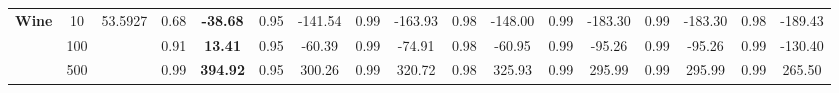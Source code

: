 \documentclass[letterpaper]{article}
\theoremstyle{definition}
\begin{document}
\begin{table}[h]
\begin{tabular}{|c|c|c|c|c|c|c|c|c|c|c|c|c|c|c|c|c|}
\multirow{3}{*}{\textbf{Wine}}      & 10       & 53.5927  & 0.68  & \textbf{-38.68}  & 0.95  & -141.54          & 0.99   & -163.93           & 0.98      & -148.00      & 0.99  & -183.30          & 0.99     & -183.30            & 0.98   & -189.43          \\ \cline{2-17} 
                                    & 100      &          & 0.91  & \textbf{13.41}   & 0.95  & -60.39           & 0.99   & -74.91            & 0.98      & -60.95       & 0.99  & -95.26           & 0.99     & -95.26             & 0.99   & -130.40          \\ \cline{2-17} 
                                    & 500      &          & 0.99  & \textbf{394.92}  & 0.95  & 300.26           & 0.99   & 320.72            & 0.98      & 325.93       & 0.99  & 295.99           & 0.99     & 295.99             & 0.99   & 265.50           \\ \hline

\end{tabular}
\end{table}

\clearpage
\end{document}
